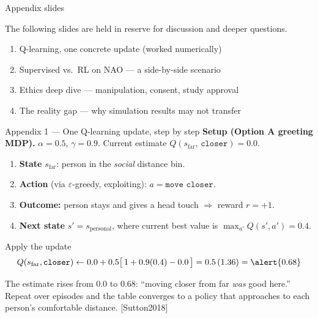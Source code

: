 \documentclass[aspectratio=169,10pt]{beamer}
\newcommand{\refnum}[1]{{\footnotesize\color{giuaccent}[#1]}}
\begin{document}
\begin{frame}{Appendix slides}
  \begin{center}
    \large The following slides are held in reserve for discussion and deeper questions.
  \end{center}
  \vspace{1em}
  \begin{enumerate}
    \item Q-learning, one concrete update (worked numerically)
    \item Supervised vs.\ RL on NAO --- a side-by-side scenario
    \item Ethics deep dive --- manipulation, consent, study approval
    \item The reality gap --- why simulation results may not transfer
  \end{enumerate}
\end{frame}

\begin{frame}{Appendix 1 --- One Q-learning update, step by step}
  \footnotesize
  \textbf{Setup (Option A greeting MDP).} $\alpha=0.5$, $\gamma=0.9$. Current estimate $Q(s_{\text{far}},\,\texttt{closer})=0.0$.
  \begin{enumerate}
    \item \textbf{State} $s_{\text{far}}$: person in the \emph{social} distance bin.
    \item \textbf{Action} (via $\varepsilon$-greedy, exploiting): $a=\texttt{move closer}$.
    \item \textbf{Outcome:} person stays and gives a head touch $\Rightarrow$ reward $r=+1$.
    \item \textbf{Next state} $s'=s_{\text{personal}}$, where current best value is $\max_{a'}Q(s',a')=0.4$.
  \end{enumerate}
  \vspace{0.3em}
  \begin{block}{Apply the update}
    \[
      Q(s_{\text{far}},\texttt{closer}) \leftarrow 0.0 + 0.5\big[\,1 + 0.9(0.4) - 0.0\,\big]
      = 0.5\,(1.36) = \alert{0.68}
    \]
  \end{block}
  \footnotesize The estimate rises from $0.0$ to $0.68$: ``moving closer from far \emph{was} good here.'' Repeat over episodes and the table converges to a policy that approaches to each person's comfortable distance. \refnum{Sutton2018}
\end{frame}
\end{document}
